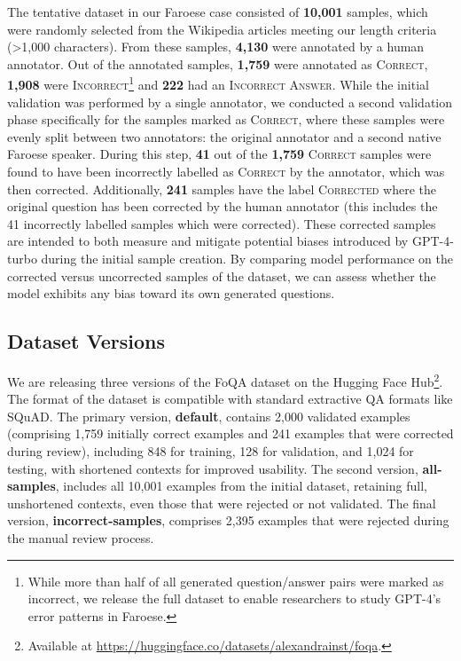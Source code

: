 \documentclass[11pt]{article}
\newcommand{\hfurl}{\url{https://huggingface.co/datasets/alexandrainst/foqa}}
\begin{document}
The tentative dataset in our Faroese case consisted of \textbf{10,001} samples, which
were randomly selected from the Wikipedia articles meeting our length criteria (>1,000
characters). From these samples, \textbf{4,130} were annotated by a human annotator. Out
of the annotated samples, \textbf{1,759} were annotated as \textsc{Correct},
\textbf{1,908} were \textsc{Incorrect}\footnote{While more than half of all generated
question/answer pairs were marked as incorrect, we release the full dataset to enable
researchers to study GPT-4's error patterns in Faroese.} and \textbf{222} had an
\textsc{Incorrect Answer}. While the initial validation was performed by a single
annotator, we conducted a second validation phase specifically for the samples marked as
\textsc{Correct}, where these samples were evenly split between two annotators: the
original annotator and a second native Faroese speaker. During this step, \textbf{41}
out of the \textbf{1,759} \textsc{Correct} samples were found to have been incorrectly
labelled as \textsc{Correct} by the annotator, which was then corrected. Additionally,
\textbf{241} samples have the label \textsc{Corrected} where the original question has
been corrected by the human annotator (this includes the 41 incorrectly labelled samples
which were corrected). These corrected samples are intended to both measure and mitigate
potential biases introduced by GPT-4-turbo during the initial sample creation. By
comparing model performance on the corrected versus uncorrected samples of the dataset,
we can assess whether the model exhibits any bias toward its own generated questions.

\subsection{Dataset Versions}
\label{subsec:versions}
We are releasing three versions of the FoQA dataset on the Hugging Face
Hub\footnote{Available at \hfurl.}. The format of the dataset is compatible with
standard extractive QA formats like SQuAD. The primary version, \textbf{default},
contains 2,000 validated examples (comprising 1,759 initially correct examples and 241
examples that were corrected during review), including 848 for training, 128 for
validation, and 1,024 for testing, with shortened contexts for improved usability. The
second version, \textbf{all-samples}, includes all 10,001 examples from the initial
dataset, retaining full, unshortened contexts, even those that were rejected or not
validated. The final version, \textbf{incorrect-samples}, comprises 2,395 examples that
were rejected during the manual review process.
\end{document}
